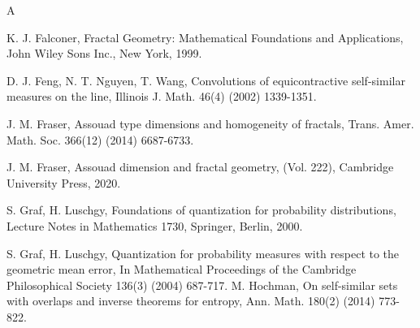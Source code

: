 \documentclass{amsproc}
\theoremstyle{definition}
\theoremstyle{remark}
\numberwithin{equation}{section}
\begin{document}
\begin{thebibliography}{A}


 K. J. Falconer, Fractal Geometry: Mathematical Foundations and Applications, John Wiley Sons Inc., New York, 1999.

 D. J. Feng, N. T. Nguyen, T. Wang, Convolutions of equicontractive self-similar measures on the line, Illinois J. Math. 46(4) (2002) 1339-1351.

  J. M. Fraser, Assouad type dimensions and homogeneity of fractals, Trans. Amer. Math. Soc. 366(12) (2014) 6687-6733.

  J. M. Fraser, Assouad dimension and fractal geometry, (Vol. 222), Cambridge University Press, 2020.

    
     S. Graf, H. Luschgy, Foundations of quantization for probability distributions, Lecture Notes in
    Mathematics 1730, Springer, Berlin, 2000.

    

     S. Graf, H. Luschgy, Quantization for probability measures with respect to the geometric mean error, In Mathematical Proceedings of the Cambridge Philosophical Society 136(3) (2004) 687-717.
  M. Hochman, On self-similar sets with overlaps and inverse theorems for entropy, Ann. Math. 180(2) (2014) 773-822.


\end{thebibliography}
\end{document}
